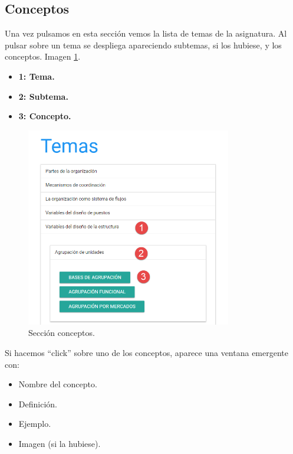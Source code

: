 \newpage

 \subsection{Conceptos}

 \bigskip
 Una vez pulsamos en esta sección vemos la lista de temas de la asignatura. Al pulsar sobre un tema se despliega apareciendo subtemas, si los hubiese, y los conceptos. Imagen \ref{fig:man_conceptos}.

\bigskip
 \begin{itemize}
    \item \textbf{1: Tema.}
    \item \textbf{2: Subtema.}
    \item \textbf{3: Concepto.}
 \end{itemize}


\begin{figure}[H]
 	\centering
 	\includegraphics[width=0.8\textwidth]{../images/manual/conceptos.png}
    \caption{Sección conceptos.}
    \label{fig:man_conceptos}
\end{figure}



 \bigskip
 Si hacemos ``click'' sobre uno de los conceptos, aparece una ventana emergente con:

\begin{itemize}
    \item Nombre del concepto.
    \item Definición.
    \item Ejemplo.
    \item Imagen (si la hubiese).
 \end{itemize} 

